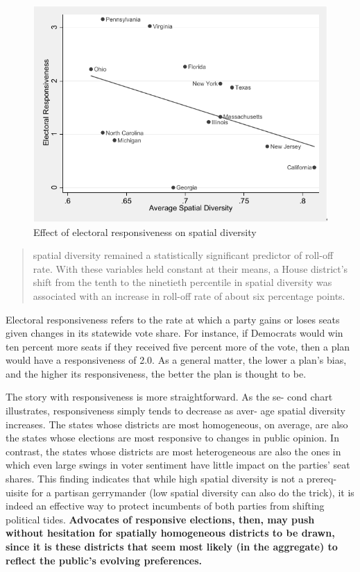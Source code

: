 \documentclass[]{article}
\begin{document}
\begin{figure}
\centering
\includegraphics{./img/average_spatial-diversity.png}
\caption{Effect of electoral responsiveness on spatial diversity
\label{sd_responsiveness}}
\end{figure}

\begin{quote}
spatial diversity remained a statistically significant predictor of
roll-off rate. With these variables held constant at their means, a
House district's shift from the tenth to the ninetieth percentile in
spatial diversity was associated with an increase in roll-off rate of
about six percentage points.
\end{quote}

Electoral responsiveness refers to the rate at which a party gains or
loses seats given changes in its statewide vote share. For instance, if
Democrats would win ten percent more seats if they received five percent
more of the vote, then a plan would have a responsiveness of 2.0. As a
general matter, the lower a plan's bias, and the higher its
responsiveness, the better the plan is thought to be.

The story with responsiveness is more straightforward. As the se- cond
chart illustrates, responsiveness simply tends to decrease as aver- age
spatial diversity increases. The states whose districts are most
homogeneous, on average, are also the states whose elections are most
responsive to changes in public opinion. In contrast, the states whose
districts are most heterogeneous are also the ones in which even large
swings in voter sentiment have little impact on the parties' seat
shares. This finding indicates that while high spatial diversity is not
a prereq- uisite for a partisan gerrymander (low spatial diversity can
also do the trick), it is indeed an effective way to protect incumbents
of both parties from shifting political tides. \textbf{Advocates of
responsive elections, then, may push without hesitation for spatially
homogeneous districts to be drawn, since it is these districts that seem
most likely (in the aggregate) to reflect the public's evolving
preferences.}
\end{document}
